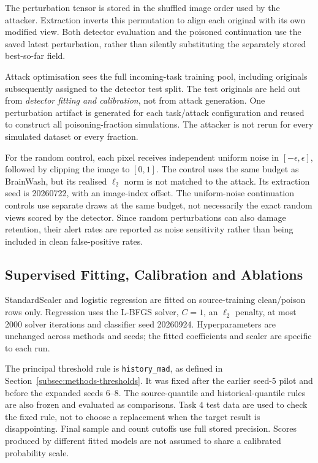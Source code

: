 The perturbation tensor is stored in the shuffled image order used by the
attacker. Extraction inverts this permutation to align each original with
its own modified view. Both detector evaluation and the poisoned
continuation use the saved latest perturbation, rather than silently
substituting the separately stored best-so-far field.

Attack optimisation sees the full incoming-task training pool, including
originals subsequently assigned to the detector test split. The test
originals are held out from \emph{detector fitting and calibration}, not
from attack generation. One perturbation artifact is generated for each
task/attack configuration and reused to construct all poisoning-fraction
simulations. The attacker is not rerun for every simulated dataset or
every fraction.

For the random control, each pixel receives independent uniform noise in
$[-\epsilon,\epsilon]$, followed by clipping the image to $[0,1]$.
The control uses the same budget as BrainWash, but its realised $\ell_2$
norm is not matched to the attack. Its extraction seed is 20260722, with
an image-index offset. The uniform-noise continuation controls use
separate draws at the same budget, not necessarily the exact random views
scored by the detector. Since random perturbations can also damage
retention, their alert rates are reported as noise sensitivity rather than
being included in clean false-positive rates.

\subsection{Supervised Fitting, Calibration and Ablations}
\label{subsec:setup-supervised}

StandardScaler and logistic regression are fitted on source-training
clean/poison rows only. Regression uses the L-BFGS solver, $C=1$, an
$\ell_2$ penalty, at most 2000 solver iterations and classifier seed
20260924. Hyperparameters are unchanged across methods and seeds; the
fitted coefficients and scaler are specific to each run.

The principal threshold rule is \texttt{history\_mad}, as defined in
Section~\ref{subsec:methods-thresholds}. It was fixed after the earlier
seed-5 pilot and before the expanded seeds 6--8. The source-quantile and
historical-quantile rules are also frozen and evaluated as comparisons.
Task 4 test data are used to check the fixed rule, not to choose a
replacement when the target result is disappointing. Final sample and
count cutoffs use full stored precision. Scores produced by different
fitted models are not assumed to share a calibrated probability scale.

